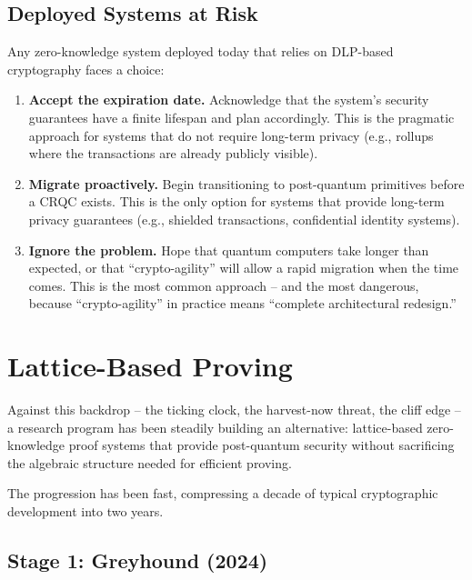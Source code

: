 \documentclass[
  11pt,
  openany]{report}
\renewcommand{\textbf}[1]{{\bfseries\color{MidnightBold}#1}}
\begin{document}
\subsection{Deployed Systems at Risk}\label{deployed-systems-at-risk}

Any zero-knowledge system deployed today that relies on DLP-based cryptography
faces a choice:

\begin{enumerate}
\def\labelenumi{\arabic{enumi}.}
\item
  \textbf{Accept the expiration date.} Acknowledge that the system's security
  guarantees have a finite lifespan and plan accordingly. This is the pragmatic
  approach for systems that do not require long-term privacy (e.g., rollups
  where the transactions are already publicly visible).
\item
  \textbf{Migrate proactively.} Begin transitioning to post-quantum primitives
  before a CRQC exists. This is the only option for systems that provide
  long-term privacy guarantees (e.g., shielded transactions, confidential
  identity systems).
\item
  \textbf{Ignore the problem.} Hope that quantum computers take longer than
  expected, or that ``crypto-agility'' will allow a rapid migration when the
  time comes. This is the most common approach -- and the most dangerous,
  because ``crypto-agility'' in practice means ``complete architectural
  redesign.''
\end{enumerate}

\section{Lattice-Based Proving}\label{lattice-based-proving}

Against this backdrop -- the ticking clock, the harvest-now threat, the cliff
edge -- a research program has been steadily building an alternative:
lattice-based zero-knowledge proof systems that provide post-quantum security
without sacrificing the algebraic structure needed for efficient proving.

The progression has been fast, compressing a decade of typical cryptographic
development into two years.

\subsection{Stage 1: Greyhound (2024)}\label{stage-1-greyhound-2024}
\end{document}
